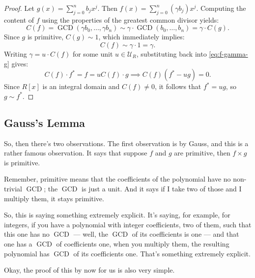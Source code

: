 \begin{content}

\begin{proof}
Let $g(x) = \sum_{j=0}^n b_j x^j$. Then $f(x) = \sum_{j=0}^n (\gamma b_j) x^j$. Computing the content of $f$ using the properties of the greatest common divisor yields:
\[
C(f) = \operatorname{GCD}(\gamma b_0, \dots, \gamma b_n) \sim \gamma \cdot \operatorname{GCD}(b_0, \dots, b_n) = \gamma \cdot C(g).
\]
Since $g$ is primitive, $C(g) \sim 1$, which immediately implies:
\[
C(f) \sim \gamma \cdot 1 = \gamma.
\]
Writing $\gamma = u \cdot C(f)$ for some unit $u \in \mathcal{U}_R$, substituting back into \eqref{eq:f-gamma-g} gives:
\[
C(f) \cdot f^* = f = u C(f) \cdot g \implies C(f)(f^* - u g) = 0.
\]
Since $R[x]$ is an integral domain and $C(f) \neq 0$, it follows that $f^* = u g$, so $g \sim f^*$.
\end{proof}
\end{content}

\subsection{Gauss's Lemma}

\begin{speech}[00:10:10 - 00:11:20]
So, then there's two observations. The first observation is by Gauss, and this is a rather famous observation. It says that suppose $f$ and $g$ are primitive, then $f \times g$ is primitive. 

Remember, primitive means that the coefficients of the polynomial have no non-trivial $\operatorname{GCD}$; the $\operatorname{GCD}$ is just a unit. And it says if I take two of those and I multiply them, it stays primitive.

So, this is saying something extremely explicit. It's saying, for example, for integers, if you have a polynomial with integer coefficients, two of them, such that this one has no $\operatorname{GCD}$ --- well, the $\operatorname{GCD}$ of its coefficients is one --- and that one has a $\operatorname{GCD}$ of coefficients one, when you multiply them, the resulting polynomial has $\operatorname{GCD}$ of its coefficients one. That's something extremely explicit.

Okay, the proof of this by now for us is also very simple.
\end{speech}

